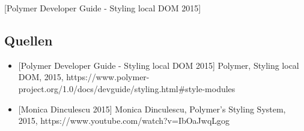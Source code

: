 \begin{Shaded}
\begin{Highlighting}[]
\KeywordTok{>}
\KeywordTok{>}
  \NormalTok{(}\OperatorTok{\{}\OperatorTok{:} \OperatorTok{\}}\NormalTok{)}\OperatorTok{;<}
\OperatorTok{-}\OperatorTok{>}
\end{Highlighting}
\end{Shaded}

{[}Polymer Developer Guide - Styling local DOM 2015{]}

\subsection{Quellen}\label{quellen}

\begin{itemize}
\tightlist
\item
  {[}Polymer Developer Guide - Styling local DOM 2015{]} Polymer,
  Styling local DOM, 2015,
  https://www.polymer-project.org/1.0/docs/devguide/styling.html\#style-modules
\item
  {[}Monica Dinculescu 2015{]} Monica Dinculescu, Polymer's Styling
  System, 2015, https://www.youtube.com/watch?v=IbOaJwqLgog
\end{itemize}
